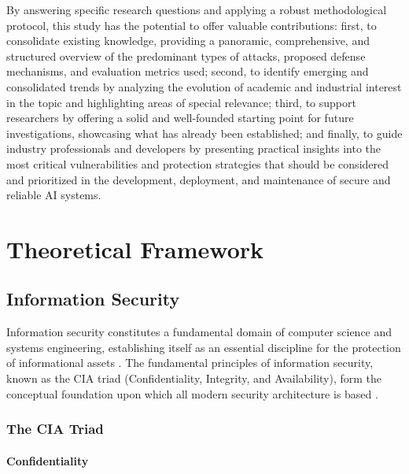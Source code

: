 \documentclass[twoside,brazilian,english]{UNISINOSmonografia}
\begin{document}
By answering specific research questions and applying a robust methodological protocol, this study has the potential to offer valuable contributions: first, to consolidate existing knowledge, providing a panoramic, comprehensive, and structured overview of the predominant types of attacks, proposed defense mechanisms, and evaluation metrics used; second, to identify emerging and consolidated trends by analyzing the evolution of academic and industrial interest in the topic and highlighting areas of special relevance; third, to support researchers by offering a solid and well-founded starting point for future investigations, showcasing what has already been established; and finally, to guide industry professionals and developers by presenting practical insights into the most critical vulnerabilities and protection strategies that should be considered and prioritized in the development, deployment, and maintenance of secure and reliable AI systems.


\chapter{Theoretical Framework}

\section{Information Security}

Information security constitutes a fundamental domain of computer science and systems engineering, establishing itself as an essential discipline for the protection of informational assets \cite{NIST2017}. The fundamental principles of information security, known as the CIA triad (Confidentiality, Integrity, and Availability), form the conceptual foundation upon which all modern security architecture is based \cite{Stallings2018}.

\subsection{The CIA Triad}

\subsubsection{Confidentiality}
\end{document}
